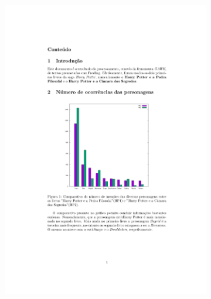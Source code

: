 \documentclass[a4paper]{article}
\begin{document}
\begin{figure}[h]
	\centering
	\begin{subfigure}{0.5\textwidth}
		\centering
		\includegraphics[width=1.3\linewidth]{grafico_pers.png}
	\end{subfigure}%
	\begin{subfigure}{0.5\textwidth}
		\centering

\end{subfigure}
\end{figure}
\end{document}
